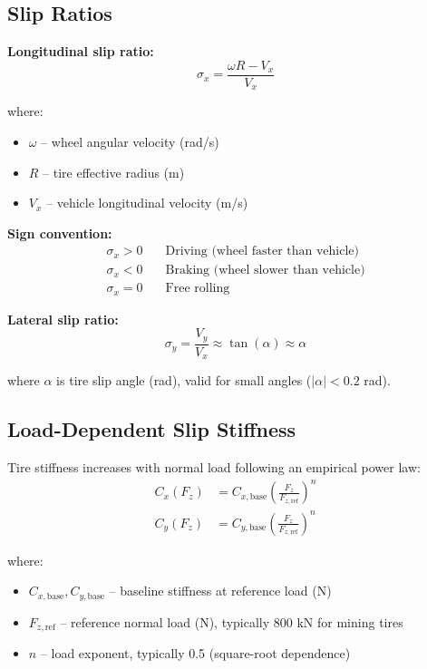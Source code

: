 \documentclass[11pt,a4paper]{article}
\begin{document}
\subsection{Slip Ratios}

\textbf{Longitudinal slip ratio:}
\begin{equation}
\sigma_x = \frac{\omega R - V_x}{V_x}
\end{equation}

where:
\begin{itemize}
    \item $\omega$ -- wheel angular velocity (rad/s)
    \item $R$ -- tire effective radius (m)
    \item $V_x$ -- vehicle longitudinal velocity (m/s)
\end{itemize}

\textbf{Sign convention:}
\begin{align}
\sigma_x > 0 &\quad \text{Driving (wheel faster than vehicle)} \\
\sigma_x < 0 &\quad \text{Braking (wheel slower than vehicle)} \\
\sigma_x = 0 &\quad \text{Free rolling}
\end{align}

\textbf{Lateral slip ratio:}
\begin{equation}
\sigma_y = \frac{V_y}{V_x} \approx \tan(\alpha) \approx \alpha
\end{equation}

where $\alpha$ is tire slip angle (rad), valid for small angles ($|\alpha| < 0.2$ rad).

\subsection{Load-Dependent Slip Stiffness}

Tire stiffness increases with normal load following an empirical power law:
\begin{align}
C_x(F_z) &= C_{x,\text{base}} \left(\frac{F_z}{F_{z,\text{ref}}}\right)^{n} \\
C_y(F_z) &= C_{y,\text{base}} \left(\frac{F_z}{F_{z,\text{ref}}}\right)^{n}
\end{align}

where:
\begin{itemize}
    \item $C_{x,\text{base}}, C_{y,\text{base}}$ -- baseline stiffness at reference load (N)
    \item $F_{z,\text{ref}}$ -- reference normal load (N), typically 800 kN for mining tires
    \item $n$ -- load exponent, typically 0.5 (square-root dependence)
\end{itemize}
\end{document}

